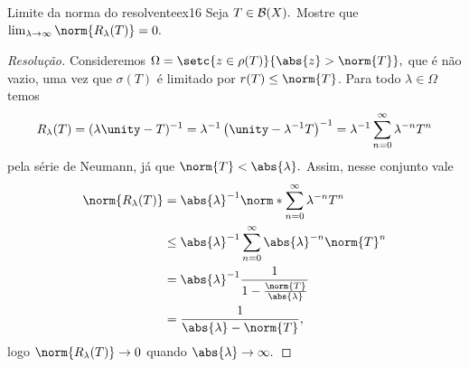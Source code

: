 \begin{exercício}{Limite da norma do resolvente}{ex16}
  Seja \(T \in \mathcal{B}(X).\) Mostre que \(\lim_{\lambda \to \infty}{\norm{R_\lambda(T)}} = 0.\)
\end{exercício}
\begin{proof}[Resolução]
  Consideremos \(\Omega = \setc{z \in \rho(T)}{\abs{z} > \norm{T}},\) que é não vazio, uma vez que \(\sigma(T)\) é limitado por \(r(T) \leq \norm{T}\). Para todo \(\lambda \in \Omega\) temos
  \begin{equation*}
    R_\lambda(T) = (\lambda \unity - T)^{-1} = \lambda^{-1} \left(\unity - \lambda^{-1} T\right)^{-1} = \lambda^{-1} \sum_{n = 0}^\infty{\lambda^{-n} T^n}
  \end{equation*}
  pela série de Neumann, já que \(\norm{T} < \abs{\lambda}.\) Assim, nesse conjunto vale
  \begin{align*}
    \norm{R_{\lambda}(T)} &= \abs{\lambda}^{-1} \norm*{\sum_{n = 0}^\infty{\lambda^{-n}T^n}}\\
                          &\leq \abs{\lambda}^{-1} \sum_{n = 0}^\infty{\abs{\lambda}^{-n} \norm{T}^n}\\
                          &= \abs{\lambda}^{-1} \frac{1}{1 - \frac{\norm{T}}{\abs{\lambda}}}\\
                          &= \frac{1}{\abs{\lambda} - \norm{T}},
  \end{align*}
  logo \(\norm{R_{\lambda}(T)} \to 0\) quando \(\abs{\lambda} \to \infty.\)
\end{proof}

